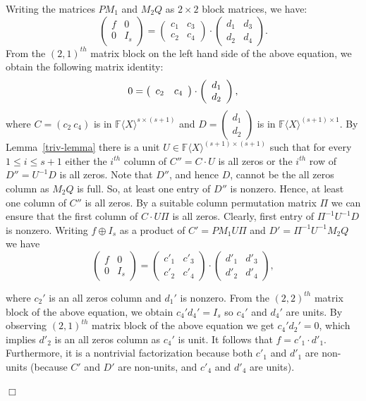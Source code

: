 \documentclass[10pt,a4paper]{article}
\newenvironment{proofof}[1]{\noindent{\it Proof of #1. }} {{\qed}}
\def\qed{\hspace*{\fill} $\Box$\par\medskip}
\newcommand{\F}{\mathbb{F}}
\renewcommand{\angle}[1]{\langle #1 \rangle}
\newcommand{\FX}{\F\angle{X}}
\newcommand{\fR}{\FX}
\begin{document}
\begin{proofof}{Theorem~\ref{associates-preseve-atoms}}
Writing the matrices $PM_1$ and $M_2Q$ as $2\times 2$ block matrices,
we have:
\[\left(
\begin{array}{c|c}
f & 0 \\
\hline
0 & I_s
\end{array}
\right) 
= \left(
\begin{array}{c|c}
c_1 & c_3 \\
\hline
c_2 & c_4
\end{array}
\right)\cdot 
\left(
\begin{array}{c|c}
d_1 & d_3 \\
\hline
d_2 & d_4
\end{array}
\right).
\]
{From} the $(2,1)^{th}$ matrix block on the left hand side of the
above equation, we obtain the following matrix identity:
\[
0 = \left(
\begin{array}{c c}
c_2 & c_4
\end{array}
\right)\cdot 
\left(
\begin{array}{c}
d_1 \\
d_2
\end{array}
\right),
\]
where $C=(c_2~c_4)$ is in $\fR^{s\times (s+1)}$ and $D=\left(
\begin{array}{c}
d_1 \\
d_2
\end{array}
\right)$ is in $\fR^{(s+1)\times 1}$. By Lemma~\ref{triv-lemma} there
is a unit $U\in \fR^{(s+1)\times (s+1)}$ such that for every $1\le
i\le s+1$ either the $i^{th}$ column of $C''=C\cdot U$ is all zeros or
the $i^{th}$ row of $D''=U^{-1} D$ is all zeros.  Note that $D''$, and
hence $D$, cannot be the all zeros column as $M_2Q$ is full. So, at
least one entry of $D''$ is nonzero. Hence, at least one column of
$C''$ is all zeros. By a suitable column permutation matrix $\Pi$ we
can ensure that the first column of $C \cdot U \Pi$ is all zeros.
Clearly, first entry of $ \Pi^{-1}U^{-1} D$ is nonzero. Writing $f
\oplus I_s$ as a product of $C'= PM_1U\Pi$ and $D'=\Pi^{-1}U^{-1}M_2Q$
we have
\[\left(
\begin{array}{c|c}
f & 0 \\
\hline
0 & I_s
\end{array}
\right) 
= \left(
\begin{array}{c|c}
c'_1 & c'_3 \\
\hline
c'_2 & c'_4
\end{array}
\right)\cdot
\left(
\begin{array}{c|c}
d'_1 & d'_3 \\
\hline
d'_2 & d'_4
\end{array}
\right),
\]

where $c_2'$ is an all zeros column and $d_1'$ is nonzero. {From} the
$(2,2)^{th}$ matrix block of the above equation, we obtain $c_4' d_4'
= I_s$ so $c_4'$ and $d_4'$ are units. By observing $(2,1)^{th}$
matrix block of the above equation we get $c_4' d_2' =0$, which
implies $d'_2$ is an all zeros column as $c_4'$ is unit.  It follows
that $f=c'_1\cdot d'_1$. Furthermore, it is a nontrivial factorization
because both $c'_1$ and $d'_1$ are non-units (because $C'$ and $D'$
are non-units, and $c'_4$ and $d'_4$ are units).
\end{proofof} 
\end{document}
